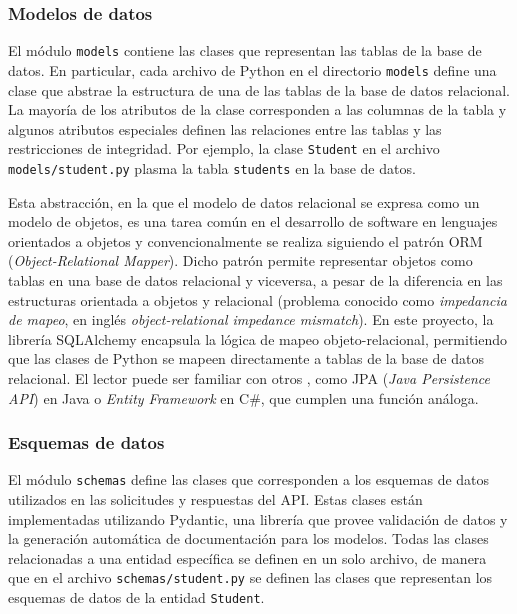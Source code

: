 \subsubsection{Modelos de datos}

El módulo \lstinline|models| contiene las clases que representan las tablas de la base de datos. En particular, cada archivo de \gls{Python} en el directorio \lstinline|models| define una clase que abstrae la estructura de una de las tablas de la base de datos relacional. La mayoría de los atributos de la clase corresponden a las columnas de la tabla y algunos atributos especiales definen las relaciones entre las tablas y las restricciones de integridad. Por ejemplo, la clase \lstinline|Student| en el archivo \lstinline|models/student.py| plasma la tabla \lstinline|students| en la base de datos.

Esta abstracción, en la que el modelo de datos relacional se expresa como un modelo de objetos, es una tarea común en el desarrollo de software en lenguajes orientados a objetos y convencionalmente se realiza siguiendo el patrón \gls{ORM} (\textit{Object-Relational Mapper}). Dicho patrón permite representar objetos como tablas en una base de datos relacional y viceversa, a pesar de la diferencia en las estructuras orientada a objetos y relacional (problema conocido como \textit{impedancia de mapeo}, en inglés \textit{object-relational impedance mismatch}). En este proyecto, la librería \gls{SQLAlchemy} encapsula la lógica de mapeo objeto-relacional, permitiendo que las clases de \gls{Python} se mapeen directamente a tablas de la base de datos relacional. El lector puede ser familiar con otros , como JPA (\textit{Java Persistence API}) en Java o \textit{Entity Framework} en C\#, que cumplen una función análoga.

\subsubsection{Esquemas de datos}
\label{subsec:schemas}

El módulo \lstinline|schemas| define las clases que corresponden a los esquemas de datos utilizados en las solicitudes y respuestas del \gls{API}. Estas clases están implementadas utilizando \gls{Pydantic}, una librería que provee validación de datos y la generación automática de documentación para los modelos. Todas las clases relacionadas a una entidad específica se definen en un solo archivo, de manera que en el archivo \lstinline|schemas/student.py| se definen las clases que representan los esquemas de datos de la entidad \lstinline|Student|.

